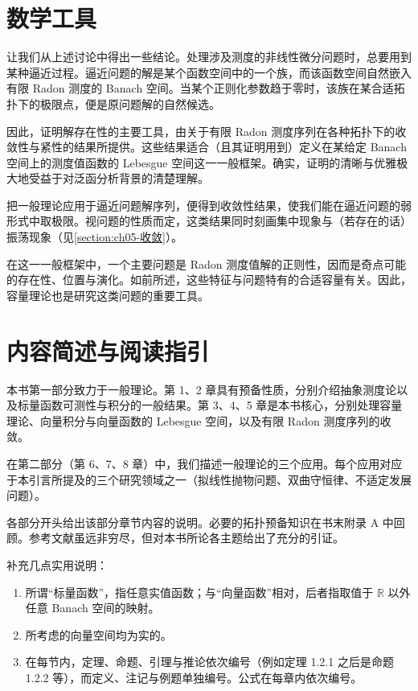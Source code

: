 \documentclass[../main.tex]{subfiles}
\begin{document}
\section*{数学工具}\label{section:intro-tools}

让我们从上述讨论中得出一些结论。处理涉及测度的非线性微分问题时，总要用到某种逼近过程。逼近问题的解是某个函数空间中的一个族，而该函数空间自然嵌入有限 Radon 测度的 Banach 空间。当某个正则化参数趋于零时，该族在某合适拓扑下的极限点，便是原问题解的自然候选。

因此，证明解存在性的主要工具，由关于有限 Radon 测度序列在各种拓扑下的收敛性与紧性的结果所提供。这些结果适合（且其证明用到）定义在某给定 Banach 空间上的测度值函数的 Lebesgue 空间这一一般框架。确实，证明的清晰与优雅极大地受益于对泛函分析背景的清楚理解。

把一般理论应用于逼近问题解序列，便得到收敛性结果，使我们能在逼近问题的弱形式中取极限。视问题的性质而定，这类结果同时刻画集中现象与（若存在的话）振荡现象（见\cref{section:ch05-收敛}）。

在这一一般框架中，一个主要问题是 Radon 测度值解的正则性，因而是奇点可能的存在性、位置与演化。如前所述，这些特征与问题特有的合适容量有关。因此，容量理论也是研究这类问题的重要工具。

\section*{内容简述与阅读指引}\label{section:intro-guide}

本书第一部分致力于一般理论。第 1、2 章具有预备性质，分别介绍抽象测度论以及标量函数可测性与积分的一般结果。第 3、4、5 章是本书核心，分别处理容量理论、向量积分与向量函数的 Lebesgue 空间，以及有限 Radon 测度序列的收敛。

在第二部分（第 6、7、8 章）中，我们描述一般理论的三个应用。每个应用对应于本引言所提及的三个研究领域之一（拟线性抛物问题、双曲守恒律、不适定发展问题）。

各部分开头给出该部分章节内容的说明。必要的拓扑预备知识在书末附录 A 中回顾。参考文献虽远非穷尽，但对本书所论各主题给出了充分的引证。

补充几点实用说明：
\begin{enumerate}[1.]
\item 所谓“标量函数”，指任意实值函数；与“向量函数”相对，后者指取值于 $\mathbb{R}$ 以外任意 Banach 空间的映射。
\item 所考虑的向量空间均为实的。
\item 在每节内，定理、命题、引理与推论依次编号（例如定理 1.2.1 之后是命题 1.2.2 等），而定义、注记与例题单独编号。公式在每章内依次编号。
\end{enumerate}
\end{document}
